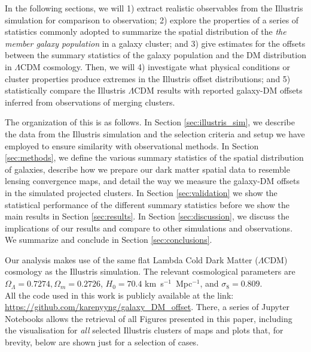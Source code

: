 \documentclass[usenatbib]{mn2e}
\newcommand{\ap}[1]{\textcolor{cyan}{#1}}
\newcommand{\sigmaSIDM}{\sigma_{\rm SIDM}}
\begin{document}
{In the following sections, we will 
1) extract realistic observables from the Illustris simulation for
comparison to observation; 2) explore the properties of a series of statistics commonly adopted to   
summarize the spatial distribution of the {\it the member galaxy population} in a galaxy cluster; and 3)	
give estimates for the offsets between the summary statistics of the galaxy  
population and the DM distribution in $\Lambda$CDM cosmology.
Then, we will 4) investigate what physical conditions or cluster properties produce extremes in the Illustris offset distributions; and 5) statistically compare the Illustris $\Lambda$CDM results with reported galaxy-DM offsets inferred from observations of merging clusters.


The organization of this  is as follows.
In Section \ref{sec:illustris_sim}, we describe the data from the Illustris simulation  
and the selection criteria and setup we have employed to ensure similarity with observational methods.
In Section \ref{sec:methods}, we define the various 
summary statistics of the spatial distribution of galaxies, describe how we prepare our dark
matter spatial data to resemble lensing convergence maps, and detail the way we measure the galaxy-DM offsets in the simulated projected clusters. In Section \ref{sec:validation} we show the statistical performance of the different summary statistics before we show the main results
in Section \ref{sec:results}. In Section \ref{sec:discussion}, 
we discuss the implications of our results and compare to other simulations and observations. We summarize and conclude in Section \ref{sec:conclusions}.

Our analysis makes use of the same flat Lambda Cold Dark Matter ($\Lambda$CDM) cosmology
as the Illustris simulation. The relevant cosmological parameters are
$\Omega_\Lambda = 0.7274, \Omega_m = 0.2726$, $H_0 = 70.4$
km~s$^{-1}$~Mpc$^{-1}$, and $\sigma_8 = 0.809$.\\

All the code used in this work is publicly available at the link: \href{https://github.com/karenyyng/galaxy\_DM\_offset}{https://github.com/karenyyng/galaxy\_DM\_offset}. There, a series of Jupyter Notebooks allows the retrieval of all Figures presented in this paper, including the visualisation for {\it all} selected Illustris clusters of maps and plots that, for brevity, below are shown just for a selection of cases. 

}
\end{document}
